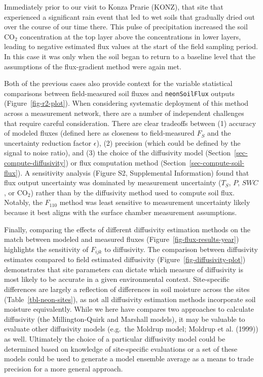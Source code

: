 \documentclass[
  letterpaper,
  DIV=11,
  numbers=noendperiod]{scrartcl}
\begin{document}
Immediately prior to our visit to Konza Prarie (KONZ), that site that
experienced a significant rain event that led to wet soils that
gradually dried out over the course of our time there. This pulse of
precipitation increased the soil CO\(_{2}\) concentration at the top
layer above the concentrations in lower layers, leading to negative
estimated flux values at the start of the field sampling period. In this
case it was only when the soil began to return to a baseline level that
the assumptions of the flux-gradient method were again met.

Both of the previous cases also provide context for the variable
statistical comparisons between field-measured soil fluxes and
\texttt{neonSoilFlux} outputs (Figure~\ref{fig-r2-plot}). When
considering systematic deployment of this method across a measurement
network, there are a number of independent challenges that require
careful consideration. There are clear tradeoffs between (1) accuracy of
modeled fluxes (defined here as closeness to field-measured \(F_{S}\)
and the uncertainty reduction factor \(\epsilon\)), (2) precision (which
could be defined by the signal to noise ratio), and (3) the choice of
the diffusivity model (Section~\ref{sec-compute-diffusivity}) or flux
computation method (Section~\ref{sec-compute-soil-flux}). A sensitivity
analysis (Figure S2, Supplemental Information) found that flux output
uncertainty was dominated by measurement uncertainty (\(T_{S}\), \(P\),
\(SWC\), or CO\(_{2}\)) rather than by the diffusivity method used to
compute soil flux. Notably, the \(F_{110}\) method was least sensitive
to measurement uncertainty likely because it best aligns with the
surface chamber measurement assumptions.

Finally, comparing the effects of different diffusivity estimation
methods on the match between modeled and measured fluxes
(Figure~\ref{fig-flux-results-year}) highlights the sensitivity of
\(F_{ijk}\) to diffusivity. The comparison between diffusivity estimates
compared to field estimated diffusivity
(Figure~\ref{fig-diffusivity-plot}) demonstrates that site parameters
can dictate which measure of diffusivity is most likely to be accurate
in a given environmental context. Site-specific differences are largely
a reflection of differences in soil moisture across the sites
(Table~\ref{tbl-neon-sites}), as not all diffusivity estimation methods
incorporate soil moisture equivalently. While we here have compares two
approaches to calculate diffusivity (the Millington-Quirk and Marshall
models), it may be valuable to evaluate other diffusivity models
(e.g.~the Moldrup model; Moldrup et al. (1999)) as well. Ultimately the
choice of a particular diffusivity model could be determined based on
knowledge of site-specific evaluations or a set of these models could be
used to generate a model ensemble average as a means to trade precision
for a more general approach.
\end{document}
